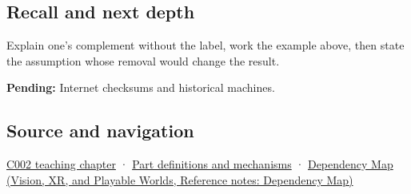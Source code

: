 \subsection{Recall and next depth}\label{appendix-03c678cd40b3-recall-and-next-depth}

Explain one's complement without the label, work the example above, then state the assumption whose removal would change the result.

\textbf{Pending:} Internet checksums and historical machines.

\subsection{Source and navigation}\label{appendix-03c678cd40b3-source-and-navigation}

\hyperref[01-foundations-i-ch001-arithmetic-becomes-a-policy]{C002 teaching chapter} · \hyperref[appendix-fd090d982a15]{Part definitions and mechanisms} · \href{../07-Vision-XR-and-Playable-Worlds/main.pdf\#nameddest=appendix-4ad47bdd269a}{Dependency Map (Vision, XR, and Playable Worlds, Reference notes: Dependency Map)}
